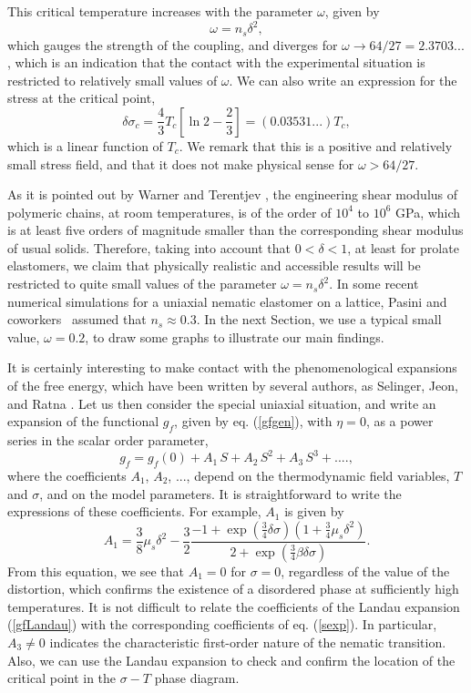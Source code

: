 \documentclass[aps,pre,reprint,amsmath,amssymbols,superscriptaddress,
nofootinbib]{revtex4-1}
\begin{document}
This critical temperature increases with the parameter $\omega$, given by%
\[
\omega=n_{s}\delta^{2},
\]
which gauges the strength of the coupling, and diverges for $\omega
\rightarrow64/27=2.3703...$, which is an indication that the contact with the
experimental situation is restricted to relatively small values of $\omega$.
We can also write an expression for the stress at the critical point,%
\[
\delta\sigma_{c}=\frac{4}{3}T_{c}\left[  \ln2-\frac{2}{3}\right]  =\left(
0.03531...\right)  T_{c},
\]
which is a linear function of $T_{c}$. We remark that this is a positive and
relatively small stress field, and that it does not make physical sense for
$\omega>64/27$.

As it is pointed out by Warner and Terentjev \cite{Warner2003}, the
engineering shear modulus of polymeric chains, at room temperatures, is of the
order of $10^{4}$ to $10^{6}$ GPa, which is at least five orders of magnitude
smaller than the corresponding shear modulus of usual solids. Therefore,
taking into account that $0<\delta<1$, at least for prolate elastomers, we
claim that physically realistic and accessible results will be restricted to
quite small values of the parameter $\omega=n_{s}\delta^{2}$. In some recent
numerical simulations for a uniaxial nematic elastomer on a lattice, Pasini
and coworkers \cite{Pasini2005}\ assumed that $n_{s}\approx0.3$. In the next
Section, we use a typical small value, $\omega=0.2$, to draw some graphs to
illustrate our main findings.

It is certainly interesting to make contact with the phenomenological
expansions of the free energy, which have been written by several authors, as
Selinger, Jeon, and Ratna \cite{Selinger2002,Selinger2004}. Let us then
consider the special uniaxial situation, and write an expansion of the
functional $g_{f}$, given by eq. (\ref{gfgen}), with $\eta=0$, as a power
series in the scalar order parameter,%
\begin{equation}
g_{f}=g_{f}\left(  0\right)  +A_{1}\,S+A_{2}\,S^{2}+A_{3}\,S^{3}%
+....,\label{gfLandau}%
\end{equation}
where the coefficients $A_{1}$, $A_{2}$, ..., depend on the thermodynamic
field variables, $T$ and $\sigma$, and on the model parameters. It is
straightforward to write the expressions of these coefficients. For example,
$A_{1}$ is given by%
\begin{equation}
A_{1}=\frac{3}{8}\mu_{s}\delta^{2}-\frac{3}{2}\frac{-1+\exp\left(  \frac{3}%
{4}\delta\sigma\right)  \left(  1+\frac{3}{4}\mu_{s}\delta^{2}\right)
}{2+\exp\left(  \frac{3}{4}\beta\delta\sigma\right)  }.
\end{equation}
From this equation, we see that $A_{1}=0$ for $\sigma=0$, regardless of the
value of the distortion, which confirms the existence of a disordered phase at
sufficiently high temperatures. It is not difficult to relate the coefficients
of the Landau expansion (\ref{gfLandau}) with the corresponding coefficients
of eq. (\ref{sexp}). In particular, $A_{3}\neq0$ indicates the characteristic
first-order nature of the nematic transition. Also, we can use the Landau
expansion to check and confirm the location of the critical point in the
$\sigma-T$ phase diagram.
\end{document}
